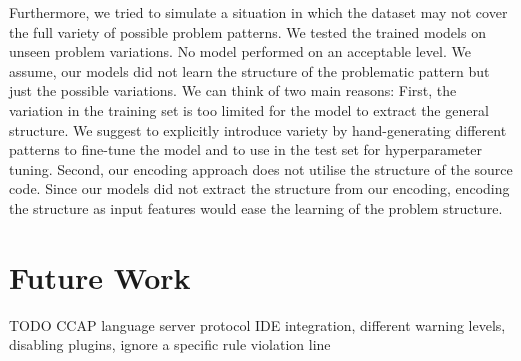 Furthermore, we tried to simulate a situation in which the dataset may not cover the full variety of possible problem patterns. We tested the trained models on unseen problem variations. No model performed on an acceptable level. We assume, our models did not learn the structure of the problematic pattern but just the possible variations. 
We can think of two main reasons: First, the variation in the training set is too limited for the model to extract the general structure. We suggest to explicitly introduce variety by hand-generating different patterns to fine-tune the model and to use in the test set for hyperparameter tuning.
Second, our encoding approach does not utilise the structure of the source code. Since our models did not extract the structure from our encoding, encoding the structure as input features would ease the learning of the problem structure.  

\section{Future Work}
TODO
CCAP language server protocol IDE integration, different warning levels, disabling plugins, ignore a specific rule violation line